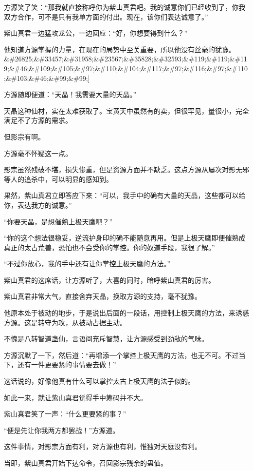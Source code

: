 \begin{this_body}
方源笑了笑：“那我就直接称呼你为紫山真君吧。我的诚意你们已经收到了，你我双方合作，可不是只有我单方面的付出。现在，该你们表达诚意了。”

紫山真君一边猛攻龙公，一边回应：“好，你想要得到什么？”

他知道方源掌握的力量，在现在的局势中至关重要，所以他没有丝毫的犹豫。\&\#26825;\&\#33457;\&\#31958;\&\#23567;\&\#35828;\&\#32593;\&\#119;\&\#119;\&\#119;\&\#46;\&\#109;\&\#105;\&\#97;\&\#110;\&\#104;\&\#117;\&\#97;\&\#116;\&\#97;\&\#110;\&\#103;\&\#46;\&\#99;\&\#99;]

方源随即便道：“天晶！我需要大量的天晶。”

天晶这种仙材，实在太难获取了。宝黄天中虽然有的卖，但很罕见，量很小，完全满足不了方源的需求。

但影宗有啊。

方源毫不怀疑这一点。

影宗虽然残破不堪，损失惨重，但是资源方面并不缺乏。这点方源从屡次对影无邪等人的追杀中，可以明显的感知到。

果然，紫山真君立即答应下来：“可以，我手中的确有大量的天晶，这些都可以给你，表达我方的诚意。”

“你要天晶，是想催熟上极天鹰吧？”

“你的这个想法很稳妥，逆流护身印的确不能随意再用。但是上极天鹰即便催熟成真正的太古荒兽，恐怕也不会受你的掌控。你的奴道手段，我很了解。”

“不过你放心，我的手中还有让你掌控上极天鹰的方法。”

紫山真君的这席话，让方源听了，大喜的同时，暗呼紫山真君的厉害。

紫山真君非常大气，直接舍弃天晶，换取方源的支持，毫不犹豫。

他原本处于被动的地步，于是说出后面的一段话，用控制上极天鹰的方法，来诱惑方源。这是转守为攻，从被动占据主动。

不愧是八转智道蛊仙，言语间充斥智慧，让方源感受到劲敌的气味。

方源沉默了一下，然后道：“再增添一个掌控上极天鹰的方法，也无不可。不过当下，还有一件更要紧的事情要去做！”

这话说的，好像他真有什么可以掌控太古上极天鹰的法子似的。

如此一来，就让紫山真君觉得手中筹码并不大。

紫山真君笑了一声：“什么更要紧的事？”

“便是先让你我两方都罢战！”方源道。

这件事情，对影宗方面有利，对方源也有利，惟独对天庭没有利。

当即，紫山真君开始下达命令，召回影宗残余的蛊仙。


\end{this_body}
